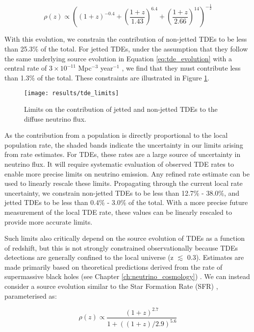 \begin{equation}
\rho(z) \propto \left( (1 + z)^{-0.4} + \left( \frac{1 + z}{1.43} \right)^{6.4} +
\left( \frac{1 + z}{2.66} \right)^{14}
\right)^{-\frac{1}{2}}
\label{eq:tde_evolution}
\end{equation}

With this evolution, we constrain the contribution of non-jetted TDEs to be less than 25.3\% of the total. For jetted TDEs, under the assumption that they follow the same underlying source evolution in Equation \ref{eq:tde_evolution} with a central rate of $3 \times 10^{-11}$ Mpc$^{-3}$ year$^{-1}$ \cite{Sun:2015bda}, we find that they must contribute less than 1.3\% of the total.  These constraints are illustrated in Figure \ref{fig:DiffuseFlux}. 

\begin{figure}[!ht]
	\centering \texttt{[image: results/tde\_limits]}
	\caption{Limits on the contribution of jetted and non-jetted TDEs to the diffuse neutrino flux.}
	\label{fig:DiffuseFlux}
\end{figure}

As the contribution from a population is directly proportional to the local population rate, the shaded bands indicate the uncertainty in our limits arising from rate estimates. For TDEs, these rates are a large source of uncertainty in neutrino flux. It will require systematic evaluation of observed TDE rates to enable more precise limits on neutrino emission. Any refined rate estimate can be used to linearly rescale these limits. Propagating through the current local rate uncertainty, we constrain non-jetted TDEs to be less than 12.7\% - 38.0\%, and jetted TDEs to be less than 0.4\% - 3.0\% of the total. With a more precise future measurement of the local TDE rate, these values can be linearly rescaled to provide more accurate limits.

Such limits also critically depend on the source evolution of TDEs as a function of redshift, but this is not strongly constrained observationally because TDEs detections are generally confined to the local universe (z $\lesssim$ 0.3). Estimates are made primarily based on theoretical predictions derived from the rate of supermassive black holes (see Chapter \ref{ch:neutrino_cosmology}) \cite{Sun:2015bda}. We can instead consider a source evolution similar to the Star Formation Rate (SFR) , parameterised as:

\begin{equation}
\rho(z) \propto\frac{(1+z)^{2.7}}{1 + ((1+z)/2.9)^{5.6}}
\label{eq:sfr_evolution}
\end{equation}

